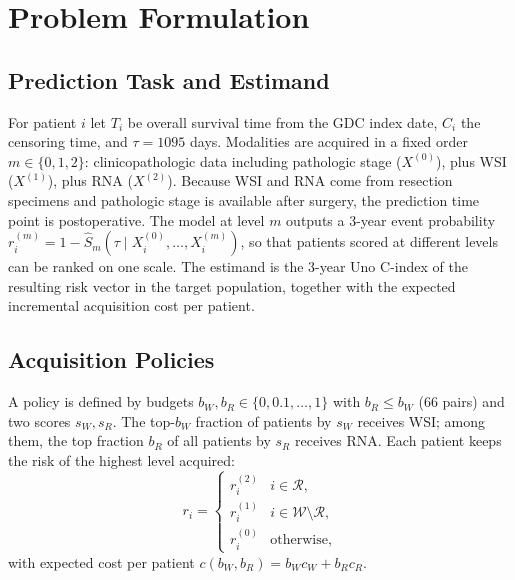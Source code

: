 \documentclass[journal,twoside,web]{IEEEtran}
\begin{document}
\section{Problem Formulation}
\label{sec:problem}
\subsection{Prediction Task and Estimand}
For patient $i$ let $T_i$ be overall survival time from the GDC index date, $C_i$ the censoring time, and $\tau = 1095$ days. Modalities are acquired in a fixed order $m \in \{0,1,2\}$: clinicopathologic data including pathologic stage ($X^{(0)}$), plus WSI ($X^{(1)}$), plus RNA ($X^{(2)}$). Because WSI and RNA come from resection specimens and pathologic stage is available after surgery, the prediction time point is postoperative. The model at level $m$ outputs a 3-year event probability $r^{(m)}_i = 1 - \hat S_m(\tau \mid X^{(0)}_i,\dots,X^{(m)}_i)$, so that patients scored at different levels can be ranked on one scale. The estimand is the 3-year Uno C-index of the resulting risk vector in the target population, together with the expected incremental acquisition cost per patient.

\subsection{Acquisition Policies}
A policy is defined by budgets $b_W, b_R \in \{0, 0.1, \dots, 1\}$ with $b_R \le b_W$ (66 pairs) and two scores $s_W, s_R$. The top-$b_W$ fraction of patients by $s_W$ receives WSI; among them, the top fraction $b_R$ of all patients by $s_R$ receives RNA. Each patient keeps the risk of the highest level acquired:
\begin{equation}
r_i = \begin{cases} r^{(2)}_i & i \in \mathcal{R},\\ r^{(1)}_i & i \in \mathcal{W}\setminus\mathcal{R},\\ r^{(0)}_i & \text{otherwise,}\end{cases}
\end{equation}
with expected cost per patient $c(b_W, b_R) = b_W c_W + b_R c_R$.
\end{document}
